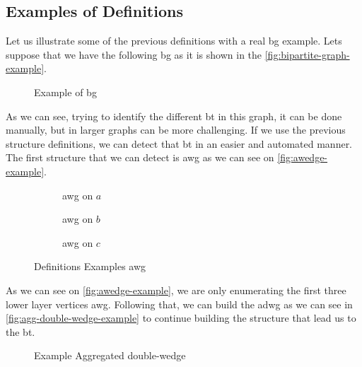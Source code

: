 \subsection{Examples of Definitions}
Let us illustrate some of the previous definitions with a real \acrlong{bg} example. 
Lets suppose that we have the following \acrshort{bg} as it is shown in the \autoref{fig:bipartite-graph-example}.

\begin{figure}[ht]
\centering	
{}
\caption[Example of \acrshort{bg}]{Example of \acrshort{bg}}
\label{fig:bipartite-graph-example}
\end{figure}

As we can see, trying to identify the different \acrshort{bt} in this graph, it can be done manually, but in larger graphs can be more challenging.
If we use the previous structure definitions, we can detect that \acrshort {bt} in an easier and automated manner.
The first structure that we can detect is \acrshort{awg} as we can see on \autoref{fig:awedge-example}.

\begin{figure}[htp!]
\begin{subfigure}[b]{0.3\textwidth}
\centering
{}
\caption{\acrshort{awg} on $a$}
\label{fig:awedge-example-a}
\end{subfigure}
\begin{subfigure}[b]{0.3\textwidth}
\centering
{}
\caption{\acrshort{awg} on $b$}
\label{fig:awedge-example-b}
\end{subfigure}
\begin{subfigure}[b]{0.3\textwidth}
\centering
{}
\caption{\acrshort{awg} on $c$}
\label{fig:awedge-example-c}
\end{subfigure}
\caption[Definitions Examples \acrshort{awg}]{Definitions Examples \acrshort{awg}}
\label{fig:awedge-example}
\end{figure}

As we can see on \autoref{fig:awedge-example}, we are only enumerating the first three lower layer vertices \acrshort{awg}.
Following that, we can build the \acrlong{adwg} as we can see in \autoref{fig:agg-double-wedge-example} to continue building the structure that lead us to the \acrshort{bt}.

\begin{figure}[htp!]
\centering
{}
\caption[Example Aggregated double-wedge]{Example Aggregated double-wedge}
\label{fig:agg-double-wedge-example}
\end{figure}

